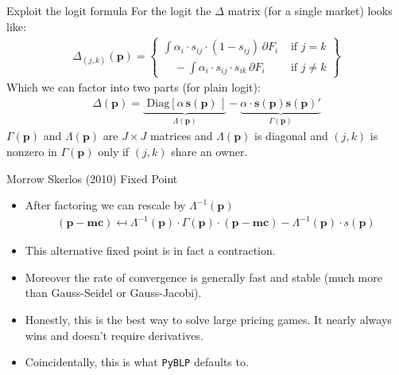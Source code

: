 \documentclass[xcolor=pdftex,dvipsnames,table,mathserif,aspectratio=169]{beamer}
\begin{document}
\begin{frame}{Exploit the logit formula}
For the logit the $\Delta$ matrix (for a single market) looks like:
\begin{align*}
\Delta_{(j,k)}(\mathbf{p}) = \left\{\begin{array}{lr}
       \int \alpha_i \cdot s_{ij}\cdot (1-s_{ij}) \, \partial F_i& \text{ if } j=k \\
       	  \quad -\int \alpha_i \cdot s_{ij} \cdot s_{ik} \, \partial F_i &  \text{ if }  j\neq k 
        \end{array} \right\}
\end{align*}
Which we can factor into two parts (for plain logit):
\begin{align*}
\Delta(\mathbf{p}) =  \underbrace{\text{ Diag}\left[ \alpha \, \mathbf{s}(\mathbf{p}) \, \right]}_{\Lambda(\mathbf{p})} -  \underbrace{\alpha \cdot \mathbf{s}(\mathbf{p}) \mathbf{s}(\mathbf{p})'}_{\Gamma(\mathbf{p})}
\end{align*}
$\Gamma(\mathbf{p})$ and $\Lambda(\mathbf{p})$ are $J \times J$ matrices and $\Lambda(\mathbf{p})$ is diagonal and $(j,k)$ is nonzero in $\Gamma(\mathbf{p})$ only if $(j,k)$ share an owner.
\end{frame}


\begin{frame}{Morrow Skerlos (2010) Fixed Point}
\begin{itemize}
\item After factoring we can rescale by $\Lambda^{-1} (\mathbf{p})$
\begin{align*}
(\mathbf{p}-\mathbf{mc} ) \mapsfrom \Lambda^{-1}(\mathbf{p}) \cdot \Gamma(\mathbf{p})\cdot(\mathbf{p}- \mathbf{mc}) - \Lambda^{-1}(\mathbf{p})\cdot s(\mathbf{p})
\end{align*}
\item This alternative fixed point is in fact a contraction.
\item Moreover the rate of convergence is generally fast and stable (much more than Gauss-Seidel or Gauss-Jacobi).
\item Honestly, this is the best way to solve large pricing games. It nearly always wins and doesn't require derivatives.
\item Coincidentally, this is what \texttt{PyBLP} defaults to.
\end{itemize}
\end{frame}
\end{document}
